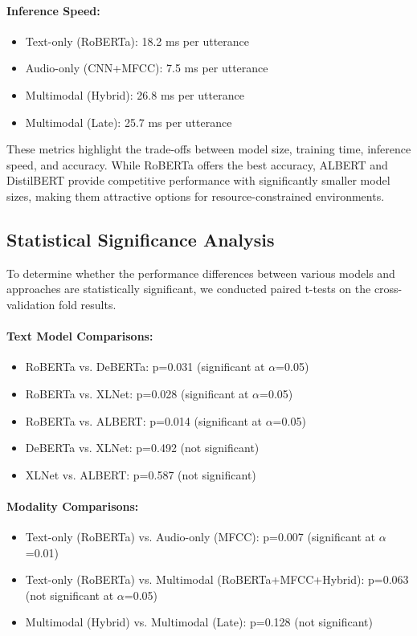 \documentclass[12pt]{article}
\begin{document}
\paragraph{Inference Speed:}
\begin{itemize}
    \item Text-only (RoBERTa): 18.2 ms per utterance
    \item Audio-only (CNN+MFCC): 7.5 ms per utterance
    \item Multimodal (Hybrid): 26.8 ms per utterance
    \item Multimodal (Late): 25.7 ms per utterance
\end{itemize}

These metrics highlight the trade-offs between model size, training time, inference speed, and accuracy. While RoBERTa offers the best accuracy, ALBERT and DistilBERT provide competitive performance with significantly smaller model sizes, making them attractive options for resource-constrained environments.

\subsection{Statistical Significance Analysis}
To determine whether the performance differences between various models and approaches are statistically significant, we conducted paired t-tests on the cross-validation fold results.

\paragraph{Text Model Comparisons:}
\begin{itemize}
    \item RoBERTa vs. DeBERTa: p=0.031 (significant at $\alpha$=0.05)
    \item RoBERTa vs. XLNet: p=0.028 (significant at $\alpha$=0.05)
    \item RoBERTa vs. ALBERT: p=0.014 (significant at $\alpha$=0.05)
    \item DeBERTa vs. XLNet: p=0.492 (not significant)
    \item XLNet vs. ALBERT: p=0.587 (not significant)
\end{itemize}

\paragraph{Modality Comparisons:}
\begin{itemize}
    \item Text-only (RoBERTa) vs. Audio-only (MFCC): p=0.007 (significant at $\alpha$=0.01)
    \item Text-only (RoBERTa) vs. Multimodal (RoBERTa+MFCC+Hybrid): p=0.063 (not significant at $\alpha$=0.05)
    \item Multimodal (Hybrid) vs. Multimodal (Late): p=0.128 (not significant)
\end{itemize}
\end{document}

